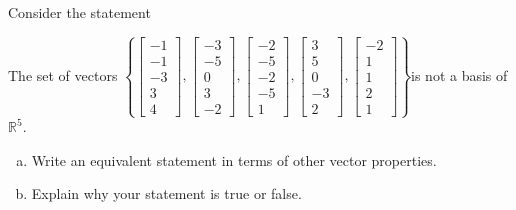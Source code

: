 
\begin{exerciseStatement}


Consider the statement 
\begin{center}\begin{minipage}{0.8\textwidth}
 The set of vectors \( \left\{ \left[\begin{array}{c}
-1 \\
-1 \\
-3 \\
3 \\
4
\end{array}\right] , \left[\begin{array}{c}
-3 \\
-5 \\
0 \\
3 \\
-2
\end{array}\right] , \left[\begin{array}{c}
-2 \\
-5 \\
-2 \\
-5 \\
1
\end{array}\right] , \left[\begin{array}{c}
3 \\
5 \\
0 \\
-3 \\
2
\end{array}\right] , \left[\begin{array}{c}
-2 \\
1 \\
1 \\
2 \\
1
\end{array}\right] \right\} \)is not a basis of \(\mathbb{R}^5\). 
\end{minipage}\end{center}
    


\begin{enumerate}[(a)]
\item  Write an equivalent statement in terms of other vector properties.
\item  Explain why your statement is true or false.
\end{enumerate}
    
\end{exerciseStatement}
    
